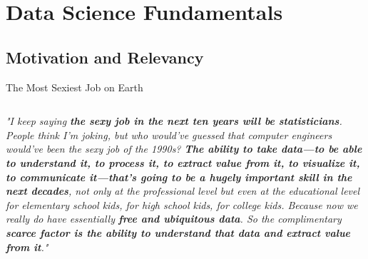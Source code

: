 \documentclass[main.tex]{subfiles}
\begin{document}
    \section{Data Science Fundamentals}
    \subsection{Motivation and Relevancy}
    
    \begin{frame}{The Most Sexiest Job on Earth}
        \begin{columns}
            \begin{column}{.6\textwidth}
                \begin{justify}
                    \textit{"I keep saying \textbf{the sexy job in the next ten years will be statisticians}. People think I’m joking, but who would’ve guessed that computer engineers would’ve been the sexy job of the 1990s? \textbf{The ability to take data—to be able to understand it, to process it, to extract value from it, to visualize it, to communicate it—that’s going to be a hugely important skill in the next decades}, not only at the professional level but even at the educational level for elementary school kids, for high school kids, for college kids. Because now we really do have essentially \textbf{free and ubiquitous data}. So the complimentary \textbf{scarce factor is the ability to understand that data and extract value from it}."}
                    \vspace*{1mm}
                    

\end{justify}
\end{column}
\end{columns}
\end{frame}
\end{document}
